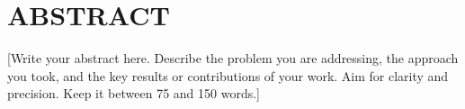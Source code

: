 %
%
%

\chapter*{ABSTRACT}


[Write your abstract here. Describe the problem you are addressing,
the approach you took, and the key results or contributions of your
work. Aim for clarity and precision. Keep it between 75 and 150 words.]
